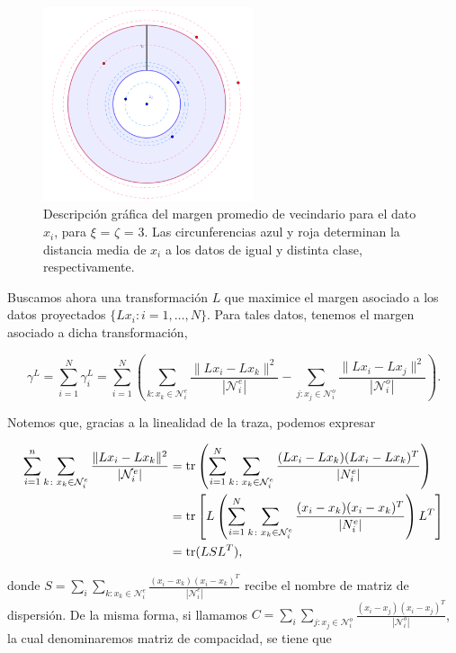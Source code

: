 \begin{figure}[h]
    \centering
    \includegraphics[width=0.55\textwidth]{./images/anmm.png}
    \caption{Descripción gráfica del margen promedio de vecindario para el dato $x_i$, para $\xi$ = $\zeta$ = 3. Las circunferencias azul y roja determinan la distancia media de $x_i$ a los datos de igual y distinta clase, respectivamente.} \label{fig:average_neighbor_margin}
\end{figure}

Buscamos ahora una transformación $L$ que maximice el margen asociado a los datos proyectados $\{Lx_i \colon i = 1,\dots,N\}$. Para tales datos, tenemos el margen asociado a dicha transformación,

\[ \gamma^L = \sum_{i=1}^{N} \gamma_i^L = \sum_{i=1}^N\left( \sum\limits_{k \colon x_k \in \mathcal{N}_i^e} \frac{\|Lx_i - Lx_k \|^2}{|\mathcal{N}_i^e|}- \sum\limits_{j \colon x_j \in \mathcal{N}_i^o} \frac{\|Lx_i - Lx_j \|^2}{|\mathcal{N}_i^o|} \right). \]

Notemos que, gracias a la linealidad de la traza, podemos expresar

\begin{align*}
    \sum_{i=1}^n\sum\limits_{k \colon x_k \in \mathcal{N}_i^e} \frac{\|Lx_i - Lx_k \|^2}{|\mathcal{N}_i^e|} &= \operatorname{tr}\left( \sum_{i=1}^N \sum\limits_{k \colon x_k \in \mathcal{N}_i^e} \frac{(Lx_i - Lx_k)(Lx_i - Lx_k)^T}{|N_i^e|} \right) \\
    &= \operatorname{tr}\left[ L \left( \sum_{i=1}^N \sum\limits_{k \colon x_k \in \mathcal{N}_i^e} \frac{(x_i-x_k)(x_i-x_k)^T}{|N_i^e|}  \right) L^T\right]\\
    &= \operatorname{tr}(LSL^T),
\end{align*}

donde $S = \sum_{i}\sum_{k\colon x_k \in \mathcal{N}_i^e}\frac{(x_i-x_k)(x_i-x_k)^T}{|\mathcal{N}_i^e|}$ recibe el nombre de matriz de dispersión. De la misma forma, si llamamos $C = \sum_{i}\sum_{j\colon x_j \in \mathcal{N}_i^o}\frac{(x_i-x_j)(x_i-x_j)^T}{|\mathcal{N}_i^o|}$, la cual denominaremos matriz de compacidad, se tiene que


